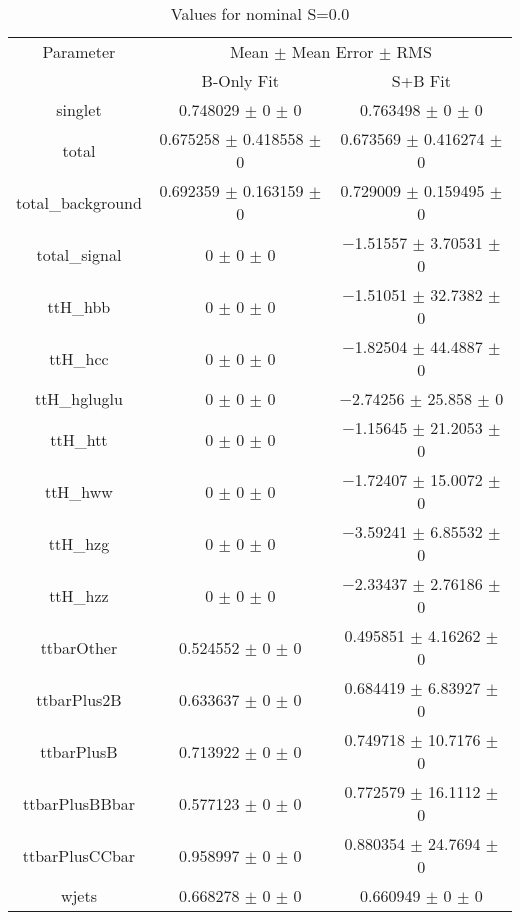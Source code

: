 \begin{table}
\centering
\caption{Values for nominal S=0.0}
\begin{tabular}{ccc}
\toprule
Parameter & \multicolumn{2}{c}{Mean $\pm$ Mean Error $\pm$ RMS}\\
 & B-Only Fit & S+B Fit\\
\midrule
singlet & \num{0.748029} $\pm$ \num{0} $\pm$ \num{0} & \num{0.763498} $\pm$ \num{0} $\pm$ \num{0}\\
total & \num{0.675258} $\pm$ \num{0.418558} $\pm$ \num{0} & \num{0.673569} $\pm$ \num{0.416274} $\pm$ \num{0}\\
total\_background & \num{0.692359} $\pm$ \num{0.163159} $\pm$ \num{0} & \num{0.729009} $\pm$ \num{0.159495} $\pm$ \num{0}\\
total\_signal & \num{0} $\pm$ \num{0} $\pm$ \num{0} & \num{-1.51557} $\pm$ \num{3.70531} $\pm$ \num{0}\\
ttH\_hbb & \num{0} $\pm$ \num{0} $\pm$ \num{0} & \num{-1.51051} $\pm$ \num{32.7382} $\pm$ \num{0}\\
ttH\_hcc & \num{0} $\pm$ \num{0} $\pm$ \num{0} & \num{-1.82504} $\pm$ \num{44.4887} $\pm$ \num{0}\\
ttH\_hgluglu & \num{0} $\pm$ \num{0} $\pm$ \num{0} & \num{-2.74256} $\pm$ \num{25.858} $\pm$ \num{0}\\
ttH\_htt & \num{0} $\pm$ \num{0} $\pm$ \num{0} & \num{-1.15645} $\pm$ \num{21.2053} $\pm$ \num{0}\\
ttH\_hww & \num{0} $\pm$ \num{0} $\pm$ \num{0} & \num{-1.72407} $\pm$ \num{15.0072} $\pm$ \num{0}\\
ttH\_hzg & \num{0} $\pm$ \num{0} $\pm$ \num{0} & \num{-3.59241} $\pm$ \num{6.85532} $\pm$ \num{0}\\
ttH\_hzz & \num{0} $\pm$ \num{0} $\pm$ \num{0} & \num{-2.33437} $\pm$ \num{2.76186} $\pm$ \num{0}\\
ttbarOther & \num{0.524552} $\pm$ \num{0} $\pm$ \num{0} & \num{0.495851} $\pm$ \num{4.16262} $\pm$ \num{0}\\
ttbarPlus2B & \num{0.633637} $\pm$ \num{0} $\pm$ \num{0} & \num{0.684419} $\pm$ \num{6.83927} $\pm$ \num{0}\\
ttbarPlusB & \num{0.713922} $\pm$ \num{0} $\pm$ \num{0} & \num{0.749718} $\pm$ \num{10.7176} $\pm$ \num{0}\\
ttbarPlusBBbar & \num{0.577123} $\pm$ \num{0} $\pm$ \num{0} & \num{0.772579} $\pm$ \num{16.1112} $\pm$ \num{0}\\
ttbarPlusCCbar & \num{0.958997} $\pm$ \num{0} $\pm$ \num{0} & \num{0.880354} $\pm$ \num{24.7694} $\pm$ \num{0}\\
wjets & \num{0.668278} $\pm$ \num{0} $\pm$ \num{0} & \num{0.660949} $\pm$ \num{0} $\pm$ \num{0}\\
\bottomrule
\end{tabular}
\end{table}